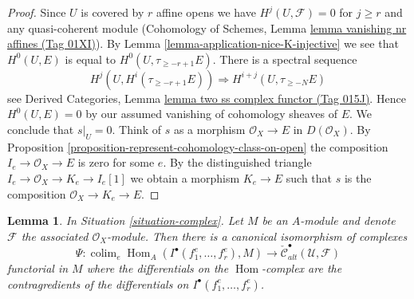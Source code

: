 \documentclass{amsart}
\theoremstyle{plain}
\newtheorem{lemma}[subsection]{Lemma}
\theoremstyle{definition}
\theoremstyle{remark}
\numberwithin{equation}{subsection}
\def\colim{\mathop{\mathrm{colim}}\nolimits}
\def\Hom{\mathop{\mathrm{Hom}}\nolimits}
\begin{document}
\begin{proof}
Since $U$ is covered by $r$ affine opens we have $H^j(U, \mathcal{F}) = 0$
for $j \geq r$ and any quasi-coherent module
(Cohomology of Schemes, Lemma \href{https://stacks.math.columbia.edu/tag/01XI}{lemma vanishing nr affines (Tag 01XI)}).
By Lemma \ref{lemma-application-nice-K-injective} we see that $H^0(U, E)$
is equal to $H^0(U, \tau_{\geq -r + 1}E)$. There is
a spectral sequence
$$
H^j(U, H^i(\tau_{\geq -r + 1}E)) \Rightarrow H^{i + j}(U, \tau_{\geq -N}E)
$$
see Derived Categories, Lemma \href{https://stacks.math.columbia.edu/tag/015J}{lemma two ss complex functor (Tag 015J)}.
Hence $H^0(U, E) = 0$ by our assumed vanishing of cohomology sheaves of $E$.
We conclude that $s|_U = 0$.
Think of $s$ as a morphism $\mathcal{O}_X \to E$ in $D(\mathcal{O}_X)$.
By Proposition \ref{proposition-represent-cohomology-class-on-open}
the composition $I_e \to \mathcal{O}_X \to E$ is zero for some $e$.
By the distinguished triangle $I_e \to \mathcal{O}_X \to K_e \to I_e[1]$
we obtain a morphism $K_e \to E$ such that $s$ is the composition
$\mathcal{O}_X \to K_e \to E$.
\end{proof}


\begin{lemma}
\label{lemma-alternating-cech-complex}
In Situation \ref{situation-complex}. Let $M$ be an $A$-module and
denote $\mathcal{F}$ the associated $\mathcal{O}_X$-module. Then
there is a canonical isomorphism of complexes
$$
\Psi : \colim_e \Hom_A(I^\bullet(f_1^e, \ldots, f_r^e), M)
\longrightarrow
\check{\mathcal{C}}_{alt}^\bullet(\mathcal{U}, \mathcal{F})
$$
functorial in $M$ where the differentials on the $\Hom$-complex
are the contragredients of the differentials on
$I^\bullet(f_1^e, \ldots, f_r^e)$.
\end{lemma}
\end{document}
